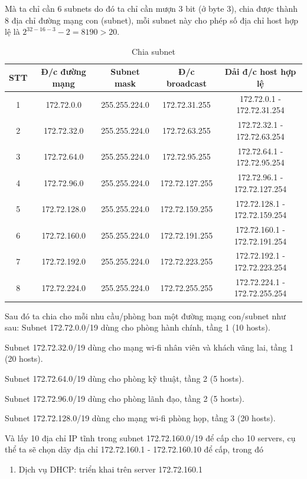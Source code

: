 \begin{enumerate}
Mà ta chỉ cần 6 subnets do đó ta chỉ cần mượn 3 bit (ở byte 3), chia được thành 8 địa chỉ đường mạng con (subnet), mỗi subnet này cho phép số địa chỉ host hợp lệ là \(2^{32-16-3}-2 = 8190 > 20\).
\begin{table}[H]
\begin{center}
\begin{tabular}{|c|c|c|c|c|}
\hline
STT & Đ/c đường mạng & Subnet mask & Đ/c broadcast & Dải đ/c host hợp lệ\\
\hline
1 & 172.72.0.0 & 255.255.224.0 & 172.72.31.255 & 172.72.0.1 - 172.72.31.254\\
\hline
2 & 172.72.32.0 & 255.255.224.0 & 172.72.63.255 & 172.72.32.1 - 172.72.63.254\\
\hline
3 & 172.72.64.0 & 255.255.224.0 & 172.72.95.255 & 172.72.64.1 - 172.72.95.254\\
\hline
4 & 172.72.96.0 & 255.255.224.0 & 172.72.127.255 & 172.72.96.1 - 172.72.127.254\\
\hline
5 & 172.72.128.0 & 255.255.224.0 & 172.72.159.255 & 172.72.128.1 - 172.72.159.254\\
\hline
6 & 172.72.160.0 & 255.255.224.0 & 172.72.191.255 & 172.72.160.1 - 172.72.191.254\\
\hline
7 & 172.72.192.0 & 255.255.224.0 & 172.72.223.255 & 172.72.192.1 - 172.72.223.254\\
\hline
8 & 172.72.224.0 & 255.255.224.0 & 172.72.255.255 & 172.72.224.1 - 172.72.255.254\\
\hline
\end{tabular}
\caption{Chia subnet}
\end{center}
\end{table}

Sau đó ta chia cho mỗi nhu cầu/phòng ban một đường mạng con/subnet như sau:
\rm
Subnet 172.72.0.0/19 dùng cho phòng hành chính, tầng 1 (10 hosts).

Subnet 172.72.32.0/19 dùng cho mạng wi-fi nhân viên và khách vãng lai, tầng 1 (20 hosts).

Subnet 172.72.64.0/19 dùng cho phòng kỹ thuật, tầng 2 (5 hosts).

Subnet 172.72.96.0/19 dùng cho phòng lãnh đạo, tầng 2 (5 hosts).

Subnet 172.72.128.0/19 dùng cho mạng wi-fi phòng họp, tầng 3 (20 hosts).

Và lấy 10 địa chỉ IP tĩnh trong subnet 172.72.160.0/19 để cấp cho 10 servers, cụ thể ta sẽ chọn dãy địa chỉ 172.72.160.1 - 172.72.160.10 để cấp, trong đó
\begin{enumerate}
\item Dịch vụ DHCP: triển khai trên server 172.72.160.1


\end{enumerate}
\end{enumerate}
